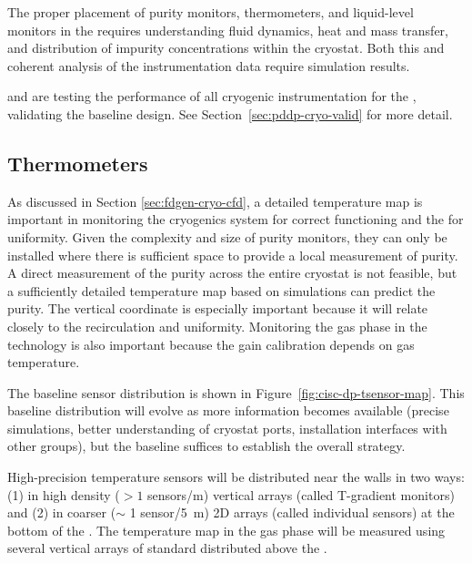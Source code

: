 The proper placement of purity monitors, thermometers, and liquid-level monitors in the  requires %
understanding \lar fluid dynamics, heat and mass transfer, and distribution of impurity concentrations within the cryostat. %
Both this and %
coherent analysis of the instrumentation data require  simulation results.


 and  are testing the performance of all cryogenic instrumentation for the , validating the baseline  %
design. See Section~\ref{sec:pddp-cryo-valid} for more detail. 


\subsection{Thermometers}
\label{sec:fddp-cryo-therm}



As discussed in Section \ref{sec:fdgen-cryo-cfd}, a detailed \threed temperature map is important %
in monitoring %
the cryogenics system for correct functioning and the \lar for uniformity.
Given the complexity and size of purity monitors, they can only be installed where there is sufficient space to provide a local measurement of
\lar purity. 
A direct measurement of the  purity across the entire cryostat is not feasible, but a sufficiently detailed \threed temperature map based on  simulations can predict the purity. The vertical coordinate is especially important because it will relate closely to the 
 recirculation and uniformity. Monitoring the gas phase in the  technology is also important because the  gain calibration depends on gas temperature. 

 
The baseline sensor distribution 
is shown in Figure~\ref{fig:cisc-dp-tsensor-map}. This baseline distribution will evolve as more information becomes available (precise  simulations, better understanding of cryostat ports, installation interfaces with other groups), but the baseline suffices to establish the overall strategy.


High-precision temperature sensors will be distributed near the   walls in two ways:
(1) in high density (\(>1\) sensors/\si{m}) vertical arrays %
(called T-gradient monitors) and (2) in coarser ($\sim$ 1 sensor/\SI{5}{m}) 2D arrays %
(called individual sensors) at the bottom of the .
The temperature map in the gas phase will be measured using several vertical arrays of standard  distributed above the .  



